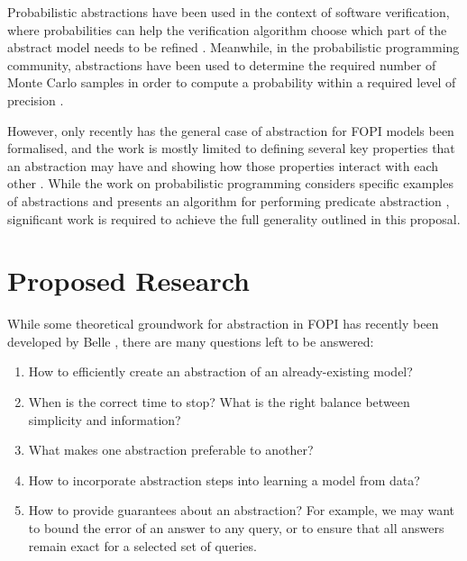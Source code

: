 \documentclass{article}
\begin{document}
Probabilistic abstractions have been used in the context of software
verification, where probabilities can help the verification algorithm choose
which part of the abstract model needs to be refined
\cite{DBLP:conf/pldi/ZhangSN17}. Meanwhile, in the probabilistic programming
community, abstractions have been used to determine the required number of Monte
Carlo samples in order to compute a probability within a required level of
precision \cite{DBLP:conf/popl/Monniaux01}.

However, only recently has the general case of abstraction for FOPI models been
formalised, and the work is mostly limited to defining several key properties
that an abstraction may have and showing how those properties interact with each
other \cite{DBLP:journals/corr/abs-1810-02434}. While the work on probabilistic
programming considers specific examples of abstractions
\cite{DBLP:conf/uai/HoltzenMB17} and presents an algorithm for performing
predicate abstraction \cite{DBLP:conf/icml/HoltzenBM18}, significant work is
required to achieve the full generality outlined in this proposal.

\section{Proposed Research} \label{section:our_solution}

While some theoretical groundwork for abstraction in FOPI has recently been
developed by Belle \cite{DBLP:journals/corr/abs-1810-02434}, there are many
questions left to be answered:
\begin{enumerate}
\item How to efficiently create an abstraction of an already-existing
  model? \label{q:1}
\item When is the correct time to stop? What is the right balance between
  simplicity and information? \label{q:2}
\item What makes one abstraction preferable to another? \label{q:3}
\item How to incorporate abstraction steps into learning a model from
  data? \label{q:4}
\item How to provide guarantees about an abstraction? For example, we may want
  to bound the error of an answer to any query, or to ensure that all answers
  remain exact for a selected set of queries. \label{q:5}
\end{enumerate}
\end{document}
